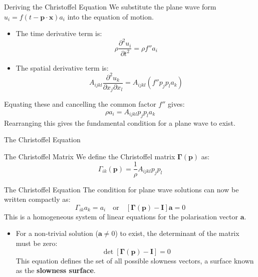 \documentclass{beamer}
\begin{document}
\begin{frame}{Deriving the Christoffel Equation}
    We substitute the plane wave form $u_{i}=f(t-\mathbf{p}\cdot\mathbf{x})a_{i}$ into the equation of motion.
    \begin{itemize}
        \item The time derivative term is:
        $$ \rho\frac{\partial^{2}u_{i}}{\partial t^{2}} = \rho f'' a_i $$
        \pause
        \item The spatial derivative term is:
        $$ A_{ijkl}\frac{\partial^{2}u_{k}}{\partial x_{j}\partial x_{l}} = A_{ijkl} (f'' p_j p_l a_k) $$
    \end{itemize}
    \pause
    Equating these and cancelling the common factor $f''$ gives:
    $$ \rho a_i = A_{ijkl} p_j p_l a_k $$
    \pause
    Rearranging this gives the fundamental condition for a plane wave to exist.
\end{frame}

\begin{frame}{The Christoffel Equation}
    \begin{block}{The Christoffel Matrix}
        We define the Christoffel matrix $\mathbf{\Gamma}(\mathbf{p})$ as:
        $$ \Gamma_{ik}(\mathbf{p})=\frac{1}{\rho}A_{ijkl}p_{j}p_{l} $$
    \end{block}
    \pause
    \begin{alertblock}{The Christoffel Equation}
        The condition for plane wave solutions can now be written compactly as:
        $$ \Gamma_{ik}a_k = a_i \quad \text{or} \quad [\mathbf{\Gamma}(\mathbf{p})-\mathbf{I}]\mathbf{a}=0 $$
        This is a homogeneous system of linear equations for the polarisation vector $\mathbf{a}$.
    \end{alertblock}
    \pause
    \begin{itemize}
        \item For a non-trivial solution ($\mathbf{a} \neq 0$) to exist, the determinant of the matrix must be zero:
        $$ \det[\mathbf{\Gamma}(\mathbf{p})-\mathbf{I}]=0 $$
        This equation defines the set of all possible slowness vectors, a surface known as the \textbf{slowness surface}.
    \end{itemize}
\end{frame}

\end{document}
